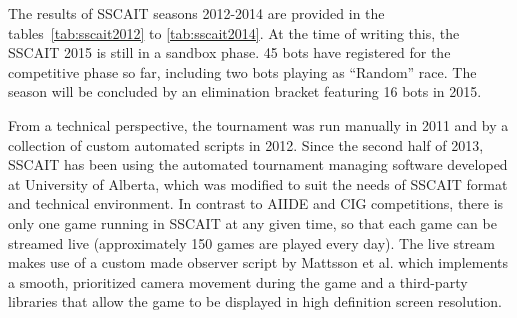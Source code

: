 \documentclass{llncs}
\begin{document}

The results of SSCAIT seasons 2012-2014 are provided in the tables~\ref{tab:sscait2012}
to \ref{tab:sscait2014}.  
  At the time of writing this, the SSCAIT 2015 is still in a sandbox phase. 45 bots have registered for the competitive phase so far, including two bots playing as ``Random'' race. The season will be concluded by an elimination bracket featuring 16 bots in 2015.


From a technical perspective, the tournament was run manually in 2011 and by a collection of custom automated scripts in 2012. Since the second half of 2013, SSCAIT has been using the automated tournament managing software developed at University of Alberta, which was modified to suit the needs of SSCAIT format and technical environment. In contrast to AIIDE and CIG competitions, there is only one game running in SSCAIT at any given time, so that each game can be streamed live (approximately 150 games are played every day). The live stream makes use of a custom made observer script by Mattsson et al. \cite{mattsson2015automatic} which implements a smooth, prioritized camera movement during the game and a third-party libraries that allow the game to be displayed in high definition screen resolution. 
\end{document}
